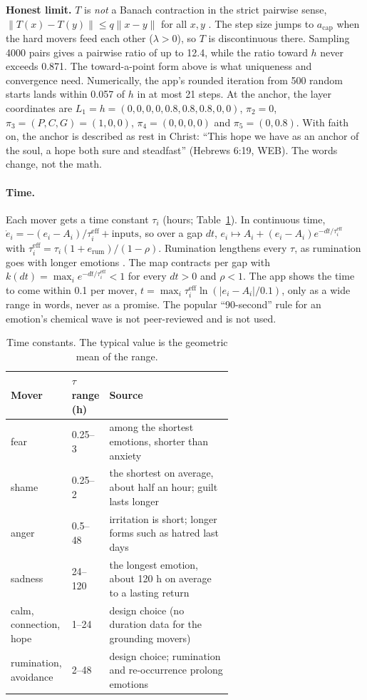 \documentclass[10pt]{article}
\theoremstyle{remark}
\begin{document}
\noindent\textbf{Honest limit.} $T$ is \emph{not} a Banach contraction in the strict pairwise sense, $\|T(x)-T(y)\|\le q\|x-y\|$ for all $x,y$ \citep{banach1922}. The step size jumps to $a_{\mathrm{cap}}$ when the hard movers feed each other ($\lambda>0$), so $T$ is discontinuous there. Sampling 4000 pairs gives a pairwise ratio of up to 12.4, while the ratio toward $h$ never exceeds 0.871. The toward-a-point form above is what uniqueness and convergence need. Numerically, the app's rounded iteration from 500 random starts lands within 0.057 of $h$ in at most 21 steps. At the anchor, the layer coordinates are $L_1=h=(0,0,0,0,0.8,0.8,0.8,0,0)$, $\pi_2=0$, $\pi_3=(P,C,G)=(1,0,0)$, $\pi_4=(0,0,0,0)$ and $\pi_5=(0,0.8)$. With faith on, the anchor is described as rest in Christ: ``This hope we have as an anchor of the soul, a hope both sure and steadfast'' (Hebrews 6:19, WEB). The words change, not the math.

\paragraph{Time.} Each mover gets a time constant $\tau_i$ (hours; Table~\ref{tab:tau}). In continuous time, $\dot e_i=-(e_i-A_i)/\tau^{\mathrm{eff}}_i+\text{inputs}$, so over a gap $dt$, $e_i\mapsto A_i+(e_i-A_i)e^{-dt/\tau^{\mathrm{eff}}_i}$ with $\tau^{\mathrm{eff}}_i=\tau_i(1+e_{\mathrm{rum}})/(1-\rho)$. Rumination lengthens every $\tau$, as rumination goes with longer emotions \citep{verduyn2015}. The map contracts per gap with $k(dt)=\max_i e^{-dt/\tau^{\mathrm{eff}}_i}<1$ for every $dt>0$ and $\rho<1$. The app shows the time to come within 0.1 per mover, $t=\max_i\tau^{\mathrm{eff}}_i\ln(|e_i-A_i|/0.1)$, only as a wide range in words, never as a promise. The popular ``90-second'' rule for an emotion's chemical wave is not peer-reviewed and is not used.

\begin{table}[h]\centering\small
\begin{tabular}{@{}llp{0.62\linewidth}@{}}\toprule
Mover & $\tau$ range (h) & Source\\\midrule
fear & 0.25--3 & among the shortest emotions, shorter than anxiety \citep{verduyn2015}\\
shame & 0.25--2 & the shortest on average, about half an hour; guilt lasts longer \citep{verduyn2015}\\
anger & 0.5--48 & irritation is short; longer forms such as hatred last days \citep{verduyn2015}\\
sadness & 24--120 & the longest emotion, about 120 h on average to a lasting return \citep{verduyn2015}\\
calm, connection, hope & 1--24 & design choice (no duration data for the grounding movers)\\
rumination, avoidance & 2--48 & design choice; rumination and re-occurrence prolong emotions \citep{verduyn2009,verduyn2015}\\\bottomrule
\end{tabular}\caption{Time constants. The typical value is the geometric mean of the range.}\label{tab:tau}\end{table}
\end{document}
